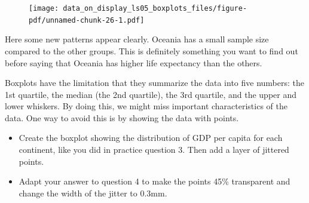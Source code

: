 \documentclass[
  letterpaper,
  DIV=11,
  numbers=noendperiod]{scrreprt}
\begin{document}
\begin{figure}[H]

{\centering \texttt{[image: data\_on\_display\_ls05\_boxplots\_files/figure-pdf/unnamed-chunk-26-1.pdf]}

}

\end{figure}

Here some new patterns appear clearly. Oceania has a small sample size
compared to the other groups. This is definitely something you want to
find out before saying that Oceania has higher life expectancy than the
others.

\begin{tcolorbox}[enhanced jigsaw, colframe=quarto-callout-note-color-frame, rightrule=.15mm, opacityback=0, breakable, coltitle=black, colbacktitle=quarto-callout-note-color!10!white, bottomrule=.15mm, leftrule=.75mm, toprule=.15mm, arc=.35mm, bottomtitle=1mm, colback=white, left=2mm, opacitybacktitle=0.6, titlerule=0mm, title=\textcolor{quarto-callout-note-color}{\faInfo}\hspace{0.5em}{Recap}, toptitle=1mm]

Boxplots have the limitation that they summarize the data into five
numbers: the 1st quartile, the median (the 2nd quartile), the 3rd
quartile, and the upper and lower whiskers. By doing this, we might miss
important characteristics of the data. One way to avoid this is by
showing the data with points.

\end{tcolorbox}

\begin{tcolorbox}[enhanced jigsaw, colframe=quarto-callout-tip-color-frame, rightrule=.15mm, opacityback=0, breakable, coltitle=black, colbacktitle=quarto-callout-tip-color!10!white, bottomrule=.15mm, leftrule=.75mm, toprule=.15mm, arc=.35mm, bottomtitle=1mm, colback=white, left=2mm, opacitybacktitle=0.6, titlerule=0mm, title=\textcolor{quarto-callout-tip-color}{\faLightbulb}\hspace{0.5em}{Practice}, toptitle=1mm]

\begin{itemize}
\item
  Create the boxplot showing the distribution of GDP per capita for each
  continent, like you did in practice question 3. Then add a layer of
  jittered points.
\item
  Adapt your answer to question 4 to make the points 45\% transparent
  and change the width of the jitter to 0.3mm.
\end{itemize}

\end{tcolorbox}
\end{document}
